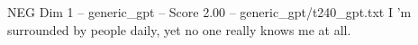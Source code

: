 \begin{textsample}{NEG Dim 1 – generic\_gpt – Score 2.00 – generic\_gpt/t240\_gpt.txt}  \label{ex:f1_neg_033}
I ’m surrounded by people daily, yet no one really knows me at all.

\end{textsample}

